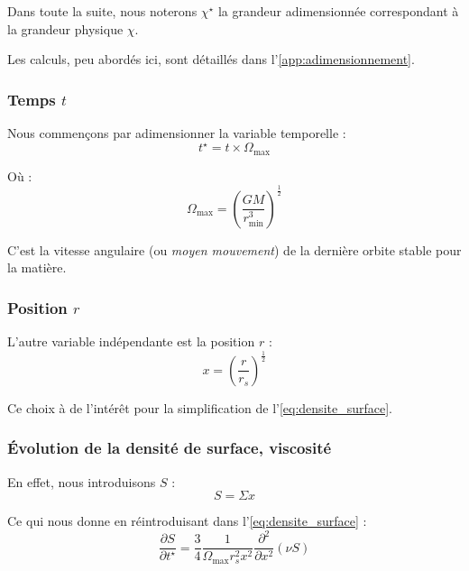 Dans toute la suite, nous noterons $\chi^\star$ la grandeur adimensionnée
correspondant à la grandeur physique $\chi$.

Les calculs, peu abordés ici, sont détaillés dans
l’\cref{app:adimensionnement}.

\subsubsection{\texorpdfstring{Temps $t$}{Temps t}}

Nous commençons par adimensionner la variable temporelle :
\begin{equation}
    t^\star = t \times \Omega_\mathrm{max}
\end{equation}

Où :
\begin{equation}
    \Omega_\mathrm{max} = \left( \frac{G M}{r^3_\mathrm{min}} \right)^\frac{1}{2}
\end{equation}

C’est la vitesse angulaire (ou \textit{moyen mouvement}) de la dernière orbite
stable pour la matière.

\subsubsection{\texorpdfstring{Position $r$}{Position r}}

L’autre variable indépendante est la position $r$ :
\begin{equation}
    x = \left( \frac{r}{r_s} \right)^\frac{1}{2}
\end{equation}

Ce choix à de l’intérêt pour la simplification de l’\cref{eq:densite_surface}.

\subsubsection{Évolution de la densité de surface, viscosité}

En effet, nous introduisons $S$ :
\begin{equation}
    S = \Sigma x
\end{equation}

Ce qui nous donne en réintroduisant dans l’\cref{eq:densite_surface} :
\begin{equation}
    \frac{\partial S}{\partial t^\star} = \frac{3}{4} \frac{1}{\Omega_\mathrm{max} r_s^2 x^2} \frac{\partial^2}{\partial x^2} \left(\nu S\right)
\end{equation}

